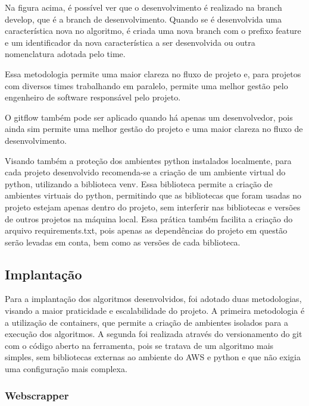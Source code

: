 Na figura acima, é possível ver que o desenvolvimento é realizado na branch develop, que é a branch de desenvolvimento. Quando se é desenvolvida uma característica nova no algoritmo, é criada uma nova branch com o prefixo feature e um identificador da nova característica a ser desenvolvida ou outra nomenclatura adotada pelo time.

Essa metodologia permite uma maior clareza no fluxo de projeto e, para projetos com diversos times trabalhando em paralelo, permite uma melhor gestão pelo engenheiro de software responsável pelo projeto.

O gitflow também pode ser aplicado quando há apenas um desenvolvedor, pois ainda sim permite uma melhor gestão do projeto e uma maior clareza no fluxo de desenvolvimento.

Visando também a proteção dos ambientes python instalados localmente, para cada projeto desenvolvido recomenda-se a criação de um ambiente virtual do python, utilizando a biblioteca venv. Essa biblioteca permite a criação de ambientes virtuais do python, permitindo que as bibliotecas que foram usadas no projeto estejam apenas dentro do projeto, sem interferir nas bibliotecas e versões de outros projetos na máquina local. Essa prática também facilita a criação do arquivo requirements.txt, pois apenas as dependências do projeto em questão serão levadas em conta, bem como as versões de cada biblioteca.

\subsection{Implantação}

Para a implantação dos algoritmos desenvolvidos, foi adotado duas metodologias, visando a maior praticidade e escalabilidade do projeto. A primeira metodologia é a utilização de containers, que permite a criação de ambientes isolados para a execução dos algoritmos. A segunda foi realizada através do versionamento do git com o código aberto na ferramenta, pois se tratava de um algoritmo mais simples, sem bibliotecas externas ao ambiente do AWS e python e que não exigia uma configuração mais complexa.

\subsubsection{Webscrapper}

